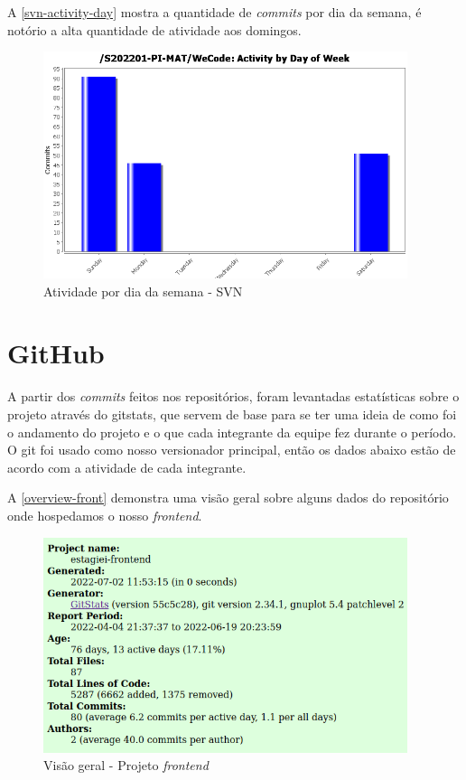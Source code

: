 A \autoref{svn-activity-day} mostra a quantidade de \textit{commits} por dia da semana, é notório a alta quantidade de atividade aos domingos.
\begin{figure}[H]
	\centering
	\caption{\label{svn-activity-day}Atividade por dia da semana - SVN}
	\includegraphics[width=0.95\textwidth]{../imagens/stats/svn-activity-day.png}
\end{figure}

\section{GitHub}
A partir dos \textit{commits} feitos nos repositórios, foram levantadas estatísticas sobre o projeto através do \gls{gitstats}, que servem de base para se ter uma ideia de como foi o andamento do projeto e o que cada integrante da equipe fez durante o período.
O \gls{git} foi usado como nosso versionador principal, então os dados abaixo estão de acordo com a atividade de cada integrante.

A \autoref{overview-front} demonstra uma visão geral sobre alguns dados do repositório onde hospedamos o nosso \textit{\gls{frontend}}.

\begin{figure}[H]
	\centering
	\caption{\label{overview-front}Visão geral - Projeto \textit{\gls{frontend}}}
	\includegraphics[width=0.95\textwidth]{../imagens/stats/overview-frontend.png}
\end{figure}

